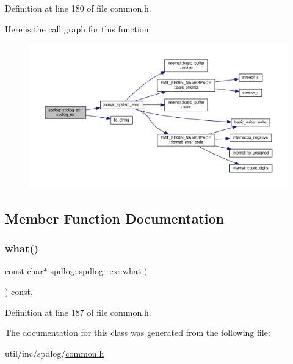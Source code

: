 Definition at line 180 of file common.\+h.

Here is the call graph for this function\+:
\nopagebreak
\begin{figure}[H]
\begin{center}
\leavevmode
\includegraphics[width=350pt]{classspdlog_1_1spdlog__ex_a0758933dd1e6c4c8e76bb8e7134f7d9b_cgraph}
\end{center}
\end{figure}


\subsection{Member Function Documentation}
\mbox{\label{classspdlog_1_1spdlog__ex_a9a9b9a7981e472cad06d453e368b6195}} 
\subsubsection{\texorpdfstring{what()}{what()}}
{\footnotesize\ttfamily const char$\ast$ spdlog\+::spdlog\+\_\+ex\+::what (\begin{DoxyParamCaption}{ }\end{DoxyParamCaption}) const\hspace{0.3cm}{\ttfamily [inline]}, {\ttfamily [override]}}



Definition at line 187 of file common.\+h.



The documentation for this class was generated from the following file\+:\begin{DoxyCompactItemize}
\item 
util/inc/spdlog/\hyperlink{common_8h}{common.\+h}\end{DoxyCompactItemize}
